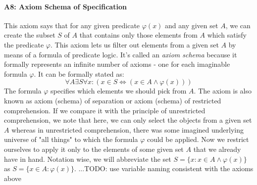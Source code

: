 
\paragraph{A8: Axiom Schema of Specification}
This axiom says that for any given predicate $\varphi(x)$ and any given set $A$, we can create the subset $S$ of $A$ that contains only those elements from $A$ which satisfy the predicate $\varphi$. This axiom lets us filter out elements from a given set $A$ by means of a formula of predicate logic. It's called an \emph{axiom schema} because it formally represents an infinite number of axioms - one for each imaginable formula $\varphi$. It can be formally stated as:
\begin{equation}
\forall A \exists S \forall x: (x \in S \Leftrightarrow (x \in A \wedge \varphi(x)) )
\end{equation}
The formula $\varphi$ specifies which elements we should pick from $A$. The axiom is also known as axiom (schema) of separation or axiom (schema) of restricted comprehension. If we compare it with the principle of unrestricted comprehension, we note that here, we can only select the objects from a given set $A$ whereas in unrestricted comprehension, there was some imagined underlying universe of "all things" to which the formula $\varphi$ could be applied. Now we restrict ourselves to apply it only to the elements of some given set $A$ that we already have in hand. Notation wise, we will abbreviate the set $S = \{ x : x \in A \wedge \varphi(x) \}$ as $S = \{ x \in A :  \varphi(x) \}$. ...TODO: use variable naming consistent with the axioms above






